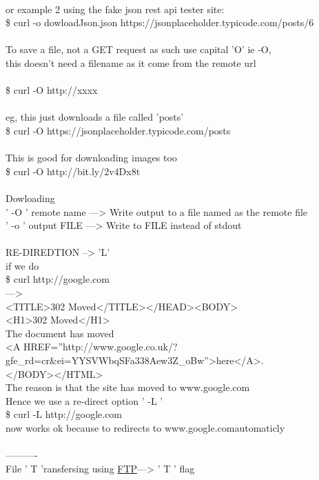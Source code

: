 \documentclass[10pt,a4paper]{article}
\begin{document}
{{{{{{{{{\\
or example 2 using the fake json rest api tester site:\\
\$ curl -o dowloadJson.json https://jsonplaceholder.typicode.com/posts/6}{\large \\
\\
To save a file, not a GET request as such use capital 'O' ie -O, \\
this doesn't need a filename as it come from the remote url\\
\\
\$ curl -O http://xxxx}{\large     \\
\\
eg, this just downloads a file called 'posts'\\
\$ curl -O https://jsonplaceholder.typicode.com/posts}{\large \\
\\
This is good for downloading images too\\
\$ curl -O http://bit.ly/2v4Dx8t}{\large \\
\\
Dowloading \\
'  -O  ' remote name  ---> Write output to a file named as the remote file\\
'  -o  '  output FILE  ---> Write to FILE instead of stdout\\
\\
RE-DIREDTION   -->   'L'\\
if we do\\
\$ curl http://google.com}{\large    \\
--->\\
<TITLE>302 Moved</TITLE></HEAD><BODY> \\
<H1>302 Moved</H1> \\
The document has moved \\
<A HREF=''http://www.google.co.uk/?gfe\_rd=cr\&ei=YYSVWbqSFa338Aew3Z\_oBw''>here</A>.}{\large  \\
</BODY></HTML>\\
The reason is that the site has moved to www.google.com}{\large \\
Hence we use a re-direct option  ' -L '\\
\$ curl -L http://google.com}{\large    \\
now works ok because to redirects to www.google.com}{\large  automaticly\\
\\
----------\\
File '  T 'ransfersing using  \hyperlink{ftp}{FTP}}{\large    ---> ' T '  flag\\
}}}}}}}}}
\end{document}
